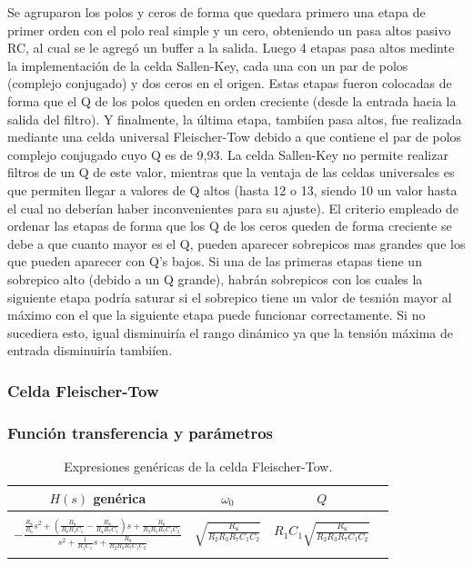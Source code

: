 Se agruparon los polos y ceros de forma que quedara primero una etapa de primer orden con el polo real simple y un cero, obteniendo un pasa altos pasivo RC, al cual se le agreg\'o un buffer a la salida. Luego 4 etapas pasa altos medinte la implementaci\'on de la celda Sallen-Key, cada una con un par de polos (complejo conjugado) y dos ceros en el origen. Estas etapas fueron colocadas de forma que el Q de los polos queden en orden creciente (desde la entrada hacia la salida del filtro). Y finalmente, la \'ultima etapa, tambi\'ien pasa altos, fue realizada mediante una celda universal Fleischer-Tow debido a que contiene el par de polos complejo conjugado cuyo Q es de 9,93. La celda Sallen-Key no permite realizar filtros de un Q de este valor, mientras que la ventaja de las celdas universales es que permiten llegar a valores de Q altos (hasta 12 o 13, siendo 10 un valor hasta el cual no deber\'ian haber inconvenientes para su ajuste). El criterio empleado de ordenar las etapas de forma que los Q de los ceros queden de forma creciente se debe a que cuanto mayor es el Q, pueden aparecer sobrepicos mas grandes que los que pueden aparecer con Q's bajos. Si una de las primeras etapas tiene un sobrepico alto (debido a un Q grande), habr\'an sobrepicos con los cuales la siguiente etapa podr\'ia saturar si el sobrepico tiene un valor de tesni\'on mayor al m\'aximo con el que la siguiente etapa puede funcionar correctamente. Si no sucediera esto, igual disminuir\'ia el rango din\'amico ya que la tensi\'on m\'axima de entrada disminuir\'ia tambi\'ien.

\subsubsection{Celda Fleischer-Tow}

\subsubsection{Funci\'on transferencia y par\'ametros}

\begin{table}[H] %
	\centering
	\begin{tabular}{c c c c}
		$H(s)$ gen\'erica & $\omega_0$ & $Q$\\
		\hline \\
		$- \frac{\frac{R_8}{R_6}s^2+\left(\frac{R_8}{R_6R_1C_1}-\frac{R_8}{R_4R_7C_1}\right)s+\frac{R_8}{R_3R_5R_7C_1C_2}}{s^2+\frac{1}{R_1C_1}s+\frac{R_8}{R_2R_3R_7C_1C_2}}$&$\sqrt{\frac{R_8}{R_2R_3R_7C_1C_2}}$&$R_1C_1\sqrt{\frac{R_8}{R_2R_3R_7C_1C_2}}$\\ \\
		\hline
	\end{tabular}
	\caption{Expresiones gen\'ericas de la celda Fleischer-Tow.}
	\label{f_generica}
\end{table}

